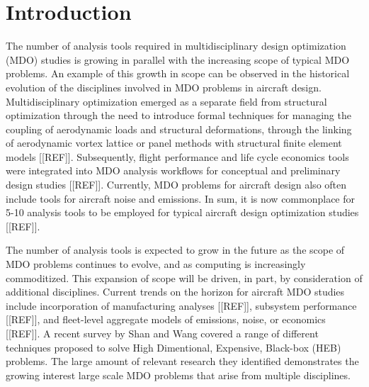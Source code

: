 \section{Introduction}
    
    The number of analysis tools required in multidisciplinary design optimization (MDO) studies is growing
    in parallel with the increasing scope of typical MDO problems. An example of this growth in scope can
    be observed in the historical evolution of the disciplines involved in MDO problems in aircraft design.
    Multidisciplinary optimization emerged as a separate field from structural optimization through the
    need to introduce formal techniques for managing the coupling of aerodynamic loads and structural
    deformations, through the linking of aerodynamic vortex lattice or panel methods with structural finite
    element models [[REF]]. Subsequently, flight performance and life cycle economics tools were integrated
    into MDO analysis workflows for conceptual and preliminary design studies [[REF]]. Currently, MDO
    problems for aircraft design also often include tools for aircraft noise and emissions. In sum, it is now
    commonplace for 5-10 analysis tools to be employed for typical aircraft design optimization studies [[REF]].
    
    The number of analysis tools is expected to grow in the future as the scope of MDO problems continues
    to evolve, and as computing is increasingly commoditized. This expansion of scope will be driven, in
    part, by consideration of additional disciplines. Current trends on the horizon for aircraft MDO studies
    include incorporation of manufacturing analyses [[REF]], subsystem performance [[REF]], and fleet-level
    aggregate models of emissions, noise, or economics [[REF]]. A recent survey by Shan and Wang covered 
    a range of different techniques proposed to solve High Dimentional, Expensive, Black-box (HEB) problems. 
    The large amount of relevant research they identified demonstrates the growing interest large scale 
    MDO problems that arise from multiple disciplines\cite{Shan2010}.

